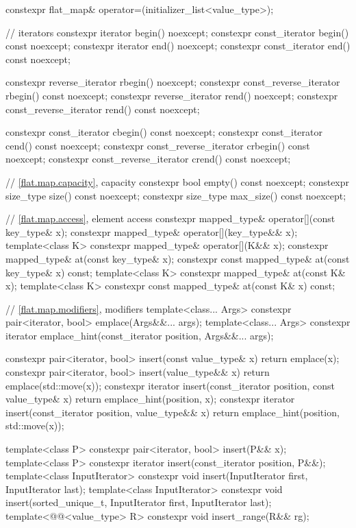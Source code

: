 \begin{codeblock}
{{    constexpr flat_map& operator=(initializer_list<value_type>);

    // iterators
    constexpr iterator               begin() noexcept;
    constexpr const_iterator         begin() const noexcept;
    constexpr iterator               end() noexcept;
    constexpr const_iterator         end() const noexcept;

    constexpr reverse_iterator       rbegin() noexcept;
    constexpr const_reverse_iterator rbegin() const noexcept;
    constexpr reverse_iterator       rend() noexcept;
    constexpr const_reverse_iterator rend() const noexcept;

    constexpr const_iterator         cbegin() const noexcept;
    constexpr const_iterator         cend() const noexcept;
    constexpr const_reverse_iterator crbegin() const noexcept;
    constexpr const_reverse_iterator crend() const noexcept;

    // \ref{flat.map.capacity}, capacity
    constexpr bool empty() const noexcept;
    constexpr size_type size() const noexcept;
    constexpr size_type max_size() const noexcept;

    // \ref{flat.map.access}, element access
    constexpr mapped_type& operator[](const key_type& x);
    constexpr mapped_type& operator[](key_type&& x);
    template<class K> constexpr mapped_type& operator[](K&& x);
    constexpr mapped_type& at(const key_type& x);
    constexpr const mapped_type& at(const key_type& x) const;
    template<class K> constexpr mapped_type& at(const K& x);
    template<class K> constexpr const mapped_type& at(const K& x) const;

    // \ref{flat.map.modifiers}, modifiers
    template<class... Args> constexpr pair<iterator, bool> emplace(Args&&... args);
    template<class... Args>
      constexpr iterator emplace_hint(const_iterator position, Args&&... args);

    constexpr pair<iterator, bool> insert(const value_type& x)
      { return emplace(x); }
    constexpr pair<iterator, bool> insert(value_type&& x)
      { return emplace(std::move(x)); }
    constexpr iterator insert(const_iterator position, const value_type& x)
      { return emplace_hint(position, x); }
    constexpr iterator insert(const_iterator position, value_type&& x)
      { return emplace_hint(position, std::move(x)); }

    template<class P> constexpr pair<iterator, bool> insert(P&& x);
    template<class P>
      constexpr iterator insert(const_iterator position, P&&);
    template<class InputIterator>
      constexpr void insert(InputIterator first, InputIterator last);
    template<class InputIterator>
      constexpr void insert(sorted_unique_t, InputIterator first, InputIterator last);
    template<@@<value_type> R>
      constexpr void insert_range(R&& rg);

}}
\end{codeblock}
